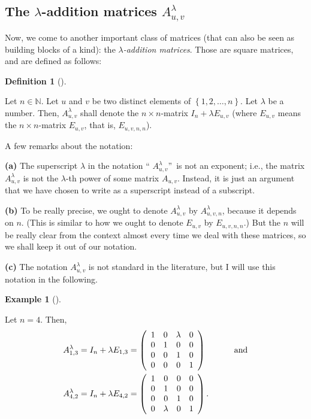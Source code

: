 \documentclass[numbers=enddot,12pt,final,onecolumn,notitlepage]{scrartcl}%
\theoremstyle{definition}
\newtheorem{defi}[theo]{Definition}
\newenvironment{definition}[1][]
{\begin{defi}[#1]\begin{leftbar}}
{\end{leftbar}\end{defi}}
\newtheorem{exam}[theo]{Example}
\newenvironment{example}[1][]
{\begin{exam}[#1]\begin{leftbar}}
{\end{leftbar}\end{exam}}
\begin{document}
\subsection{\label{sect.gauss.Alamuv}The $\lambda$-addition matrices
$A_{u,v}^{\lambda}$}

Now, we come to another important class of matrices (that can also be seen as
building blocks of a kind): the $\lambda$\textit{-addition matrices}. Those
are square matrices, and are defined as follows:

\begin{definition}
\label{def.Alamuv}Let $n\in\mathbb{N}$. Let $u$ and $v$ be two distinct
elements of $\left\{  1,2,\ldots,n\right\}  $. Let $\lambda$ be a number.
Then, $A_{u,v}^{\lambda}$ shall denote the $n\times n$-matrix $I_{n}+\lambda
E_{u,v}$ (where $E_{u,v}$ means the $n\times n$-matrix $E_{u,v}$, that is,
$E_{u,v,n,n}$).

A few remarks about the notation:

\textbf{(a)} The superscript $\lambda$ in the notation \textquotedblleft%
$A_{u,v}^{\lambda}$\textquotedblright\ is not an exponent; i.e., the matrix
$A_{u,v}^{\lambda}$ is not the $\lambda$-th power of some matrix $A_{u,v}$.
Instead, it is just an argument that we have chosen to write as a superscript
instead of a subscript.

\textbf{(b)} To be really precise, we ought to denote $A_{u,v}^{\lambda}$ by
$A_{u,v,n}^{\lambda}$, because it depends on $n$. (This is similar to how we
ought to denote $E_{u,v}$ by $E_{u,v,n,n}$.) But the $n$ will be really clear
from the context almost every time we deal with these matrices, so we shall
keep it out of our notation.

\textbf{(c)} The notation $A_{u,v}^{\lambda}$ is not standard in the
literature, but I will use this notation in the following.
\end{definition}

\begin{example}
\label{exam.Alamuv}Let $n=4$. Then,%
\begin{align*}
A_{1,3}^{\lambda}  &  =I_{n}+\lambda E_{1,3}=\left(
\begin{array}
[c]{cccc}%
1 & 0 & \lambda & 0\\
0 & 1 & 0 & 0\\
0 & 0 & 1 & 0\\
0 & 0 & 0 & 1
\end{array}
\right)  \ \ \ \ \ \ \ \ \ \ \text{and}\\
A_{4,2}^{\lambda}  &  =I_{n}+\lambda E_{4,2}=\left(
\begin{array}
[c]{cccc}%
1 & 0 & 0 & 0\\
0 & 1 & 0 & 0\\
0 & 0 & 1 & 0\\
0 & \lambda & 0 & 1
\end{array}
\right)  .
\end{align*}

\end{example}
\end{document}
